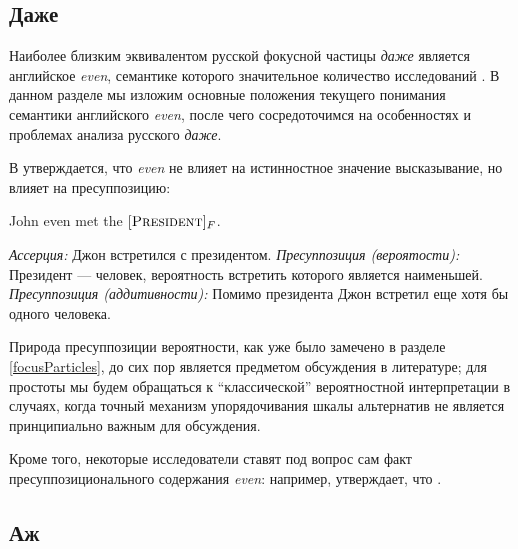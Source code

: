 \documentclass[a4paper, titlepage, 12pt]{article}
\begin{document}
\subsection{Даже}

Наиболее близким эквивалентом русской фокусной частицы \textit{даже} является английское \textit{even}, семантике которого значительное количество исследований \citep{horn1969presuppositional,stalnaker1974pragmatic,rullmann1997even,iatridou2016our,kay1990even}. В данном разделе мы изложим основные положения текущего понимания семантики английского \textit{even}, после чего сосредоточимся на особенностях и проблемах анализа русского \textit{даже}.

\medskip

В \citep{horn1969presuppositional} утверждается, что \textit{even} не влияет на истинностное значение высказывание, но влияет на пресуппозицию:

\begin{exe}
    \ex \label{onlyAssPres} John even met the $ [\textsc{President}]_F $. \begin{xlist}
        \ex \textit{Ассерция:} Джон встретился с президентом.
        \ex \textit{Пресуппозиция (вероятости):} Президент --- человек, вероятность встретить которого является наименьшей.
        \ex \textit{Пресуппозиция (аддитивности):} Помимо президента Джон встретил еще хотя бы одного человека.
    \end{xlist}
\end{exe}

Природа пресуппозиции вероятности, как уже было замечено в разделе \ref{focusParticles}, до сих пор является предметом обсуждения в литературе; для простоты мы будем обращаться к ``классической'' вероятностной интерпретации в случаях, когда точный механизм упорядочивания шкалы альтернатив не является принципиально важным для обсуждения.

\medskip

Кроме того, некоторые исследователи ставят под вопрос сам факт пресуппозиционального содержания \textit{even}: например, \citep{bach1999myth} утверждает, что .

\subsection{Аж} \label{azh}

\newpage
 

\end{document}
